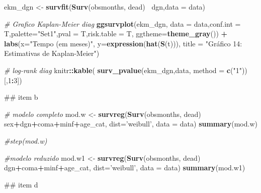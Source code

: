 \documentclass[]{article}
\newenvironment{Shaded}{\begin{snugshade}}{\end{snugshade}}
\newcommand{\KeywordTok}[1]{\textcolor[rgb]{0.13,0.29,0.53}{\textbf{#1}}}
\newcommand{\DataTypeTok}[1]{\textcolor[rgb]{0.13,0.29,0.53}{#1}}
\newcommand{\DecValTok}[1]{\textcolor[rgb]{0.00,0.00,0.81}{#1}}
\newcommand{\StringTok}[1]{\textcolor[rgb]{0.31,0.60,0.02}{#1}}
\newcommand{\CommentTok}[1]{\textcolor[rgb]{0.56,0.35,0.01}{\textit{#1}}}
\newcommand{\OperatorTok}[1]{\textcolor[rgb]{0.81,0.36,0.00}{\textbf{#1}}}
\newcommand{\NormalTok}[1]{#1}
\begin{document}
\begin{Shaded}
\begin{Highlighting}[]
{{\NormalTok{ekm_dgn <-}\StringTok{ }\KeywordTok{survfit}\NormalTok{(}\KeywordTok{Surv}\NormalTok{(obsmonths, dead)}\OperatorTok{~}\StringTok{ }\NormalTok{dgn,}\DataTypeTok{data =}\NormalTok{ data)}

\CommentTok{# Grafico Kaplan-Meier diag}
\KeywordTok{ggsurvplot}\NormalTok{(ekm_dgn, }\DataTypeTok{data =}\NormalTok{ data,}\DataTypeTok{conf.int =}\NormalTok{ T,}\DataTypeTok{palette=}\StringTok{"Set1"}\NormalTok{,}\DataTypeTok{pval =}\NormalTok{ T,}\DataTypeTok{risk.table =}\NormalTok{ T,}
           \DataTypeTok{ggtheme=}\KeywordTok{theme_gray}\NormalTok{()) }\OperatorTok{+}\StringTok{ }
\StringTok{  }\KeywordTok{labs}\NormalTok{(}\DataTypeTok{x=}\StringTok{"Tempo (em meses)"}\NormalTok{,}
       \DataTypeTok{y=}\KeywordTok{expression}\NormalTok{(}\KeywordTok{hat}\NormalTok{(}\KeywordTok{S}\NormalTok{(t))),}
       \DataTypeTok{title =} \StringTok{"Gráfico 14: Estimativas de Kaplan-Meier"}\NormalTok{) }

\CommentTok{# log-rank diag}
\NormalTok{knitr}\OperatorTok{::}\KeywordTok{kable}\NormalTok{( }\KeywordTok{surv_pvalue}\NormalTok{(ekm_dgn,data, }\DataTypeTok{method =} \KeywordTok{c}\NormalTok{(}\StringTok{"1"}\NormalTok{))[,}\DecValTok{1}\OperatorTok{:}\DecValTok{3}\NormalTok{])}

\NormalTok{## item b}

\CommentTok{# modelo completo}
\NormalTok{mod.w <-}\StringTok{ }\KeywordTok{survreg}\NormalTok{(}\KeywordTok{Surv}\NormalTok{(obsmonths, dead)}\OperatorTok{~}\StringTok{ }\NormalTok{sex}\OperatorTok{+}\NormalTok{dgn}\OperatorTok{+}\NormalTok{coma}\OperatorTok{+}\NormalTok{minf}\OperatorTok{+}\NormalTok{age_cat, }\DataTypeTok{dist=}\StringTok{'weibull'}\NormalTok{,}
                 \DataTypeTok{data =}\NormalTok{ data)}
\KeywordTok{summary}\NormalTok{(mod.w)}

\CommentTok{#step(mod.w)}

\CommentTok{#modelo reduzido}
\NormalTok{mod.w1 <-}\StringTok{ }\KeywordTok{survreg}\NormalTok{(}\KeywordTok{Surv}\NormalTok{(obsmonths, dead)}\OperatorTok{~}\StringTok{ }\NormalTok{dgn}\OperatorTok{+}\NormalTok{coma}\OperatorTok{+}\NormalTok{minf}\OperatorTok{+}\NormalTok{age_cat, }\DataTypeTok{dist=}\StringTok{'weibull'}\NormalTok{,}
                  \DataTypeTok{data =}\NormalTok{ data)}
\KeywordTok{summary}\NormalTok{(mod.w1)}

\NormalTok{## item d}

}}
\end{Highlighting}
\end{Shaded}
\end{document}
